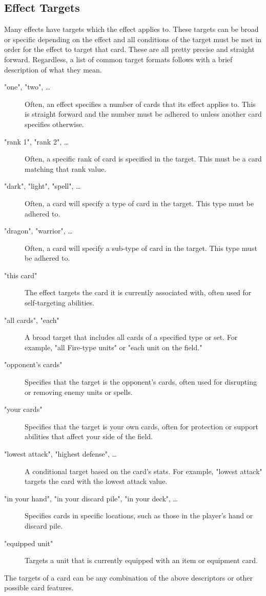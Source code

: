 \subsection{Effect Targets}
Many effects have targets which the effect applies to. These targets can be broad or specific depending on the effect and all conditions of the target must be met in order for the effect to target that card. These are all pretty precise and straight forward. Regardless, a list of common target formats follows with a brief description of what they mean.
\begin{description}
  \item["one", "two", \dots] Often, an effect specifies a number of cards that its effect applies to. This is straight forward and the number must be adhered to unless another card specifies otherwise.
  \item["rank 1", "rank 2", \dots] Often, a specific rank of card is specified in the target. This must be a card matching that rank value.
  \item["dark", "light", "spell", \dots] Often, a card will specify a type of card in the target. This type must be adhered to.
  \item["dragon", "warrior", \dots] Often, a card will specify a sub-type of card in the target. This type must be adhered to.
  \item["this card"] The effect targets the card it is currently associated with, often used for self-targeting abilities.
  \item["all cards", "each"] A broad target that includes all cards of a specified type or set. For example, "all Fire-type units" or "each unit on the field."
  \item["opponent's cards"] Specifies that the target is the opponent's cards, often used for disrupting or removing enemy units or spells.
  \item["your cards"] Specifies that the target is your own cards, often for protection or support abilities that affect your side of the field.
  \item["lowest attack", "highest defense", \dots] A conditional target based on the card’s stats. For example, "lowest attack" targets the card with the lowest attack value.
  \item["in your hand", "in your discard pile", "in your deck", \dots] Specifies cards in specific locations, such as those in the player's hand or discard pile.
  \item["equipped unit"] Targets a unit that is currently equipped with an item or equipment card.
\end{description}
The targets of a card can be any combination of the above descriptors or other possible card features.




